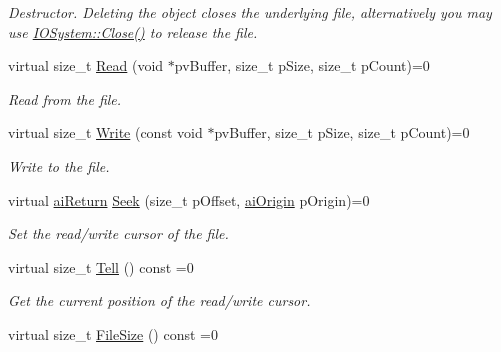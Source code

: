 \begin{CompactItemize}
\begin{CompactList}\small\item\em Destructor. Deleting the object closes the underlying file, alternatively you may use \hyperlink{class_assimp_1_1_i_o_system_8c334d60f04bceeb6bd0157d21723f3e}{IOSystem::Close()} to release the file. \item\end{CompactList}\item 
virtual size\_\-t \hyperlink{class_assimp_1_1_i_o_stream_e376f641020989d61863b9c6f55c7abf}{Read} (void $\ast$pvBuffer, size\_\-t pSize, size\_\-t pCount)=0
\begin{CompactList}\small\item\em Read from the file. \item\end{CompactList}\item 
virtual size\_\-t \hyperlink{class_assimp_1_1_i_o_stream_d0ca4aae1b8c4d00db391ac3a4171f7b}{Write} (const void $\ast$pvBuffer, size\_\-t pSize, size\_\-t pCount)=0
\begin{CompactList}\small\item\em Write to the file. \item\end{CompactList}\item 
virtual \hyperlink{types_8h_1f78dfb65090aa930cabb984c8abe711}{aiReturn} \hyperlink{class_assimp_1_1_i_o_stream_5ed0dddf418ab08cf3fc21f3f3032220}{Seek} (size\_\-t pOffset, \hyperlink{types_8h_c50fbaa57d78776ca99e42104d9b2786}{aiOrigin} pOrigin)=0
\begin{CompactList}\small\item\em Set the read/write cursor of the file. \item\end{CompactList}\item 
virtual size\_\-t \hyperlink{class_assimp_1_1_i_o_stream_316ac6cd16b5a493d1313f792c806194}{Tell} () const =0
\begin{CompactList}\small\item\em Get the current position of the read/write cursor. \item\end{CompactList}\item 
\hypertarget{class_assimp_1_1_i_o_stream_aa01183d197fb714f28d6c611b6fa058}{
virtual size\_\-t \hyperlink{class_assimp_1_1_i_o_stream_aa01183d197fb714f28d6c611b6fa058}{FileSize} () const =0}
\label{class_assimp_1_1_i_o_stream_aa01183d197fb714f28d6c611b6fa058}


\end{CompactItemize}
